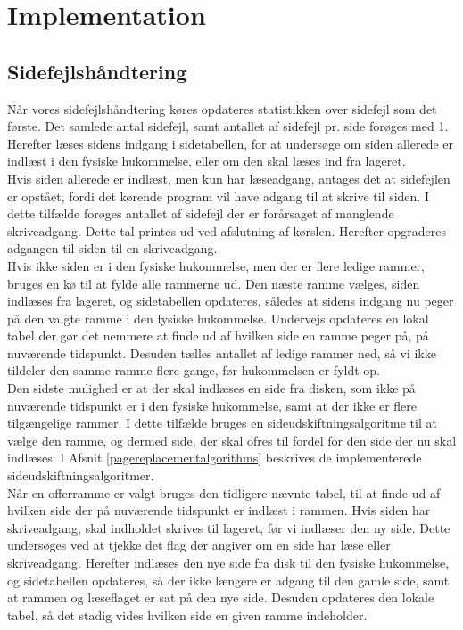 \section{Implementation}
\subsection{Sidefejlshåndtering}
Når vores sidefejlshåndtering køres opdateres statistikken over sidefejl som det første. Det samlede antal sidefejl, samt antallet af sidefejl pr. side forøges med 1. Herefter læses sidens indgang i sidetabellen, for at undersøge om siden allerede er indlæst i den fysiske hukommelse, eller om den skal læses ind fra lageret.\\

Hvis siden allerede er indlæst, men kun har læseadgang, antages det at sidefejlen er opstået, fordi det kørende program vil have adgang til at skrive til siden. I dette tilfælde forøges antallet af sidefejl der er forårsaget af manglende skriveadgang. Dette tal printes ud ved afslutning af kørslen. Herefter opgraderes adgangen til siden til en skriveadgang.\\

Hvis ikke siden er i den fysiske hukommelse, men der er flere ledige rammer, bruges en kø til at fylde alle rammerne ud. Den næste ramme vælges, siden indlæses fra lageret, og sidetabellen opdateres, således at sidens indgang nu peger på den valgte ramme i den fysiske hukommelse. Undervejs opdateres en lokal tabel der gør det nemmere at finde ud af hvilken side en ramme peger på, på nuværende tidspunkt. Desuden tælles antallet af ledige rammer ned, så vi ikke tildeler den samme ramme flere gange, før hukommelsen er fyldt op.\\

Den sidste mulighed er at der skal indlæses en side fra disken, som ikke på nuværende tidspunkt er i den fysiske hukommelse, samt at der ikke er flere tilgængelige rammer. I dette tilfælde bruges en sideudskiftningsalgoritme til at vælge den ramme, og dermed side, der skal ofres til fordel for den side der nu skal indlæses. I Afsnit \ref{pagereplacementalgorithms} beskrives de implementerede sideudskiftningsalgoritmer.\\

Når en offerramme er valgt bruges den tidligere nævnte tabel, til at finde ud af hvilken side der på nuværende tidspunkt er indlæst i rammen. Hvis siden har skriveadgang, skal indholdet skrives til lageret, før vi indlæser den ny side. Dette undersøges ved at tjekke det flag der angiver om en side har læse eller skriveadgang. Herefter indlæses den nye side fra disk til den fysiske hukommelse, og sidetabellen opdateres, så der ikke længere er adgang til den gamle side, samt at rammen og læseflaget er sat på den nye side. Desuden opdateres den lokale tabel, så det stadig vides hvilken side en given ramme indeholder.

